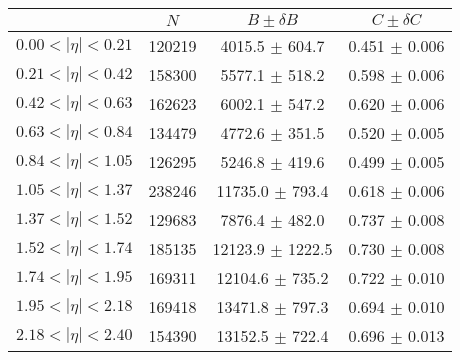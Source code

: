 \begin{tabular}{lccc}
\hline
    &   $N$   & $B \pm \delta B$  &  $C \pm \delta C$ \\
\hline
$0.00 < |\eta| <0.21$          & 120219     & 4015.5     $\pm$ 604.7 & 0.451      $\pm$ 0.006 \\
$0.21 < |\eta| <0.42$          & 158300     & 5577.1     $\pm$ 518.2 & 0.598      $\pm$ 0.006 \\
$0.42 < |\eta| <0.63$          & 162623     & 6002.1     $\pm$ 547.2 & 0.620      $\pm$ 0.006 \\
$0.63 < |\eta| <0.84$          & 134479     & 4772.6     $\pm$ 351.5 & 0.520      $\pm$ 0.005 \\
$0.84 < |\eta| <1.05$          & 126295     & 5246.8     $\pm$ 419.6 & 0.499      $\pm$ 0.005 \\
$1.05 < |\eta| <1.37$          & 238246     & 11735.0    $\pm$ 793.4 & 0.618      $\pm$ 0.006 \\
$1.37 < |\eta| <1.52$          & 129683     & 7876.4     $\pm$ 482.0 & 0.737      $\pm$ 0.008 \\
$1.52 < |\eta| <1.74$          & 185135     & 12123.9    $\pm$ 1222.5 & 0.730      $\pm$ 0.008 \\
$1.74 < |\eta| <1.95$          & 169311     & 12104.6    $\pm$ 735.2 & 0.722      $\pm$ 0.010 \\
$1.95 < |\eta| <2.18$          & 169418     & 13471.8    $\pm$ 797.3 & 0.694      $\pm$ 0.010 \\
$2.18 < |\eta| <2.40$          & 154390     & 13152.5    $\pm$ 722.4 & 0.696      $\pm$ 0.013 \\
\hline
\end{tabular}
